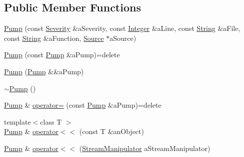 \subsection*{Public Member Functions}
\begin{DoxyCompactItemize}
\item 
\mbox{\hyperlink{classlibrary_1_1core_1_1logger_1_1_pump_af5c515afe6d1ca6c4f388235d4a79562}{Pump}} (const \mbox{\hyperlink{namespacelibrary_1_1core_1_1logger_a35f71353edf64f68f7fe3874b01abaa8}{Severity}} \&a\+Severity, const \mbox{\hyperlink{classlibrary_1_1core_1_1types_1_1_integer}{Integer}} \&a\+Line, const \mbox{\hyperlink{classlibrary_1_1core_1_1types_1_1_string}{String}} \&a\+File, const \mbox{\hyperlink{classlibrary_1_1core_1_1types_1_1_string}{String}} \&a\+Function, \mbox{\hyperlink{classlibrary_1_1core_1_1logger_1_1_source}{Source}} $\ast$a\+Source)
\item 
\mbox{\hyperlink{classlibrary_1_1core_1_1logger_1_1_pump_aafed314a368b091eff03f8acf145d6cc}{Pump}} (const \mbox{\hyperlink{classlibrary_1_1core_1_1logger_1_1_pump}{Pump}} \&a\+Pump)=delete
\item 
\mbox{\hyperlink{classlibrary_1_1core_1_1logger_1_1_pump_a1c0e7c1344e56794a715343152d38a19}{Pump}} (\mbox{\hyperlink{classlibrary_1_1core_1_1logger_1_1_pump}{Pump}} \&\&a\+Pump)
\item 
\mbox{\hyperlink{classlibrary_1_1core_1_1logger_1_1_pump_a43b87428630493027b5cffda75169c14}{$\sim$\+Pump}} ()
\item 
\mbox{\hyperlink{classlibrary_1_1core_1_1logger_1_1_pump}{Pump}} \& \mbox{\hyperlink{classlibrary_1_1core_1_1logger_1_1_pump_a23a5f5db6b17d42b0738cd4897ce22f5}{operator=}} (const \mbox{\hyperlink{classlibrary_1_1core_1_1logger_1_1_pump}{Pump}} \&a\+Pump)=delete
\item 
{\footnotesize template$<$class T $>$ }\\\mbox{\hyperlink{classlibrary_1_1core_1_1logger_1_1_pump}{Pump}} \& \mbox{\hyperlink{classlibrary_1_1core_1_1logger_1_1_pump_a97404c60a1271461a10d6a1e894a7810}{operator$<$$<$}} (const T \&an\+Object)
\item 
\mbox{\hyperlink{classlibrary_1_1core_1_1logger_1_1_pump}{Pump}} \& \mbox{\hyperlink{classlibrary_1_1core_1_1logger_1_1_pump_a6bc2dee9c4757e5726ce8d25a4126fa4}{operator$<$$<$}} (\mbox{\hyperlink{classlibrary_1_1core_1_1logger_1_1_pump_ab8990ff21e57c39977af471ddeb57637}{Stream\+Manipulator}} a\+Stream\+Manipulator)
\end{DoxyCompactItemize}


